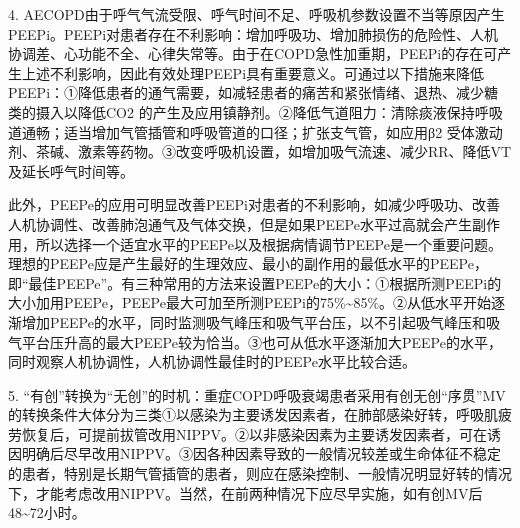 4.
AECOPD由于呼气气流受限、呼气时间不足、呼吸机参数设置不当等原因产生PEEPi。PEEPi对患者存在不利影响：增加呼吸功、增加肺损伤的危险性、人机协调差、心功能不全、心律失常等。由于在COPD急性加重期，PEEPi的存在可产生上述不利影响，因此有效处理PEEPi具有重要意义。可通过以下措施来降低PEEPi：①降低患者的通气需要，如减轻患者的痛苦和紧张情绪、退热、减少糖类的摄入以降低CO{2}
的产生及应用镇静剂。②降低气道阻力：清除痰液保持呼吸道通畅；适当增加气管插管和呼吸管道的口径；扩张支气管，如应用β{2}
受体激动剂、茶碱、激素等药物。③改变呼吸机设置，如增加吸气流速、减少RR、降低VT及延长呼气时间等。

此外，PEEPe的应用可明显改善PEEPi对患者的不利影响，如减少呼吸功、改善人机协调性、改善肺泡通气及气体交换，但是如果PEEPe水平过高就会产生副作用，所以选择一个适宜水平的PEEPe以及根据病情调节PEEPe是一个重要问题。理想的PEEPe应是产生最好的生理效应、最小的副作用的最低水平的PEEPe，即“最佳PEEPe”。有三种常用的方法来设置PEEPe的大小：①根据所测PEEPi的大小加用PEEPe，PEEPe最大可加至所测PEEPi的75\%\textasciitilde{}85\%。②从低水平开始逐渐增加PEEPe的水平，同时监测吸气峰压和吸气平台压，以不引起吸气峰压和吸气平台压升高的最大PEEPe较为恰当。③也可从低水平逐渐加大PEEPe的水平，同时观察人机协调性，人机协调性最佳时的PEEPe水平比较合适。

5.
“有创”转换为“无创”的时机：重症COPD呼吸衰竭患者采用有创无创“序贯”MV的转换条件大体分为三类①以感染为主要诱发因素者，在肺部感染好转，呼吸肌疲劳恢复后，可提前拔管改用NIPPV。②以非感染因素为主要诱发因素者，可在诱因明确后尽早改用NIPPV。③因各种因素导致的一般情况较差或生命体征不稳定的患者，特别是长期气管插管的患者，则应在感染控制、一般情况明显好转的情况下，才能考虑改用NIPPV。当然，在前两种情况下应尽早实施，如有创MV后48\textasciitilde{}72小时。
